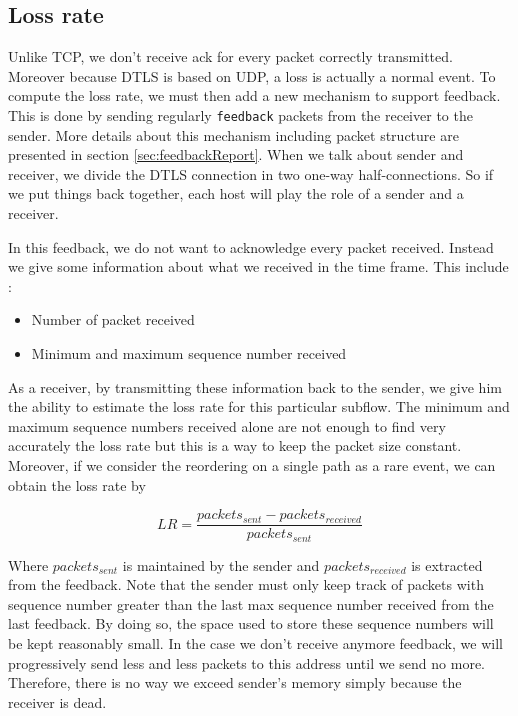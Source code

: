 \subsection{Loss rate}

Unlike TCP, we don't receive ack for every packet correctly transmitted. Moreover because DTLS is based on UDP, a loss is actually a normal event. To compute the loss rate, we must then add a new mechanism to support feedback. This is done by sending regularly \verb!feedback! packets from the receiver to the sender. More details about this mechanism including packet structure are presented in section \ref{sec:feedbackReport}. When we talk about sender and receiver, we divide the DTLS connection in two one-way half-connections. So if we put things back together, each host will play the role of a sender and a receiver.

In this feedback, we do not want to acknowledge every packet received. Instead we give some information about what we received in the time frame. This include : 

\begin{itemize}
\item Number of packet received
\item Minimum and maximum sequence number received
\end{itemize}

As a receiver, by transmitting these information back to the sender, we give him the ability to estimate the loss rate for this particular subflow. The minimum and maximum sequence numbers received alone are not enough to find very accurately the loss rate but this is a way to keep the packet size constant. Moreover, if we consider the reordering on a single path as a rare event, we can obtain the loss rate by 

\begin{equation*}
LR = \frac{packets_{sent} - packets_{received}}{packets_{sent}}
\end{equation*}

Where $packets_{sent}$ is maintained by the sender and $packets_{received}$ is extracted from the feedback. Note that the sender must only keep track of packets with sequence number greater than the last max sequence number received from the last feedback. By doing so, the space used to store these sequence numbers will be kept reasonably small. In the case we don't receive anymore feedback, we will progressively send less and less packets to this address until we send no more. Therefore, there is no way we exceed sender's memory simply because the receiver is dead. 


